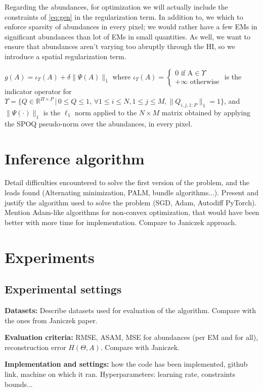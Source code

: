 \documentclass[conference]{IEEEtran}
\begin{document}
Regarding the abundances, for optimization we will actually include the constraints of \ref{eq:gen} in the regularization term. In addition to, we which to enforce sparsity of abundances in every pixel; we would rather have a few EMs in significant abundances than lot of EMs in small quantities. As well, we want to ensure that abundances aren't varying too abruptly through the HI, so we introduce a spatial regularization term.

$g(A) = \iota_\Upsilon(A) + \delta \| \Psi(A) \|_{1}$ where $\iota_\Upsilon (A) = \begin{cases} 0 \text{ if A}\in \Upsilon\\ +\infty \text{ otherwise} \end{cases}$ is the indicator operator for $\Upsilon = \{Q \in \mathbb{R}^{\Pi \times P}\, |\, 0 \leq Q \leq 1,\, \forall 1 \leq i \leq N, 1 \leq j \leq M, \| Q_{i, j, 1:P} \|_1 = 1\}$, and $\| \Psi(\cdot) \|_{1}$ is the $\ell_1$ norm applied to the $N \times M$ matrix obtained by applying the SPOQ pseudo-norm over the abundances, in every pixel.


\section{Inference algorithm}
Detail difficulties encountered to solve the first version of the problem, and the leads found (Alternating minimization, PALM, bundle algorithms...). Present and justify the algorithm used to solve the problem (SGD, Adam, Autodiff PyTorch). Mention Adam-like algorithms for non-convex optimization, that would have been better with more time for implementation. Compare to Janiczek approach.

\section{Experiments}
\subsection{Experimental settings}
\textbf{Datasets:} Describe datasets used for evaluation of the algorithm. Compare with the ones from Janiczek paper.

\textbf{Evaluation criteria:} RMSE, ASAM, MSE for abundances (per EM and for all), reconstruction error $H(\Theta, A)$. Compare with Janiczek.

\textbf{Implementation and settings:} how the code has been implemented, github link, machine on which it ran. Hyperparameters: learning rate, constraints bounds...
\end{document}

